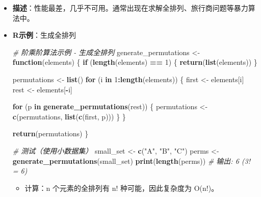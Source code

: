 \documentclass[
]{book}
\newenvironment{Shaded}{\begin{snugshade}}{\end{snugshade}}
\newcommand{\CommentTok}[1]{\textcolor[rgb]{0.56,0.35,0.01}{\textit{#1}}}
\newcommand{\ControlFlowTok}[1]{\textcolor[rgb]{0.13,0.29,0.53}{\textbf{#1}}}
\newcommand{\DecValTok}[1]{\textcolor[rgb]{0.00,0.00,0.81}{#1}}
\newcommand{\FunctionTok}[1]{\textcolor[rgb]{0.13,0.29,0.53}{\textbf{#1}}}
\newcommand{\NormalTok}[1]{#1}
\newcommand{\OtherTok}[1]{\textcolor[rgb]{0.56,0.35,0.01}{#1}}
\newcommand{\SpecialCharTok}[1]{\textcolor[rgb]{0.81,0.36,0.00}{\textbf{#1}}}
\newcommand{\StringTok}[1]{\textcolor[rgb]{0.31,0.60,0.02}{#1}}
\providecommand{\tightlist}{%
  \setlength{\itemsep}{0pt}\setlength{\parskip}{0pt}}
\begin{document}
\begin{itemize}
\item
  \textbf{描述}：性能最差，几乎不可用。通常出现在求解全排列、旅行商问题等暴力算法中。
\item
  \textbf{R示例}：生成全排列

\begin{Shaded}
\begin{Highlighting}[]
\CommentTok{\# 阶乘阶算法示例 {-} 生成全排列}
\NormalTok{generate\_permutations }\OtherTok{\textless{}{-}} \ControlFlowTok{function}\NormalTok{(elements) \{}
  \ControlFlowTok{if}\NormalTok{ (}\FunctionTok{length}\NormalTok{(elements) }\SpecialCharTok{==} \DecValTok{1}\NormalTok{) \{}
    \FunctionTok{return}\NormalTok{(}\FunctionTok{list}\NormalTok{(elements))}
\NormalTok{  \}}

\NormalTok{  permutations }\OtherTok{\textless{}{-}} \FunctionTok{list}\NormalTok{()}
  \ControlFlowTok{for}\NormalTok{ (i }\ControlFlowTok{in} \DecValTok{1}\SpecialCharTok{:}\FunctionTok{length}\NormalTok{(elements)) \{}
\NormalTok{    first }\OtherTok{\textless{}{-}}\NormalTok{ elements[i]}
\NormalTok{    rest }\OtherTok{\textless{}{-}}\NormalTok{ elements[}\SpecialCharTok{{-}}\NormalTok{i]}

    \ControlFlowTok{for}\NormalTok{ (p }\ControlFlowTok{in} \FunctionTok{generate\_permutations}\NormalTok{(rest)) \{}
\NormalTok{      permutations }\OtherTok{\textless{}{-}} \FunctionTok{c}\NormalTok{(permutations, }\FunctionTok{list}\NormalTok{(}\FunctionTok{c}\NormalTok{(first, p)))}
\NormalTok{    \}}
\NormalTok{  \}}

  \FunctionTok{return}\NormalTok{(permutations)}
\NormalTok{\}}

\CommentTok{\# 测试（使用小数据集）}
\NormalTok{small\_set }\OtherTok{\textless{}{-}} \FunctionTok{c}\NormalTok{(}\StringTok{"A"}\NormalTok{, }\StringTok{"B"}\NormalTok{, }\StringTok{"C"}\NormalTok{)}
\NormalTok{perms }\OtherTok{\textless{}{-}} \FunctionTok{generate\_permutations}\NormalTok{(small\_set)}
\FunctionTok{print}\NormalTok{(}\FunctionTok{length}\NormalTok{(perms))  }\CommentTok{\# 输出: 6 (3! = 6)}
\end{Highlighting}
\end{Shaded}

  \begin{itemize}
  \tightlist
  \item
    计算：n 个元素的全排列有 n! 种可能，因此复杂度为 O(n!)。
  \end{itemize}
\end{itemize}
\end{document}
